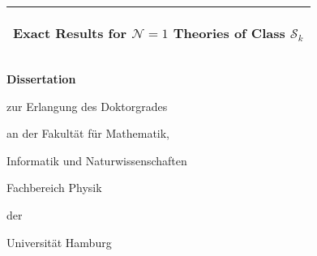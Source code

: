 
\frontmatter

\pagestyle{fancy}
\fancyhf{} %
\renewcommand{\headrulewidth}{0pt} %
\fancyhead[LE,RO]{\thepage} %
\fancyhead[RE]{\MakeTextUppercase{\leftmark}} %
\renewcommand{\chaptermark}[1]{\markboth{#1}{}} %
\setlength{\headheight}{13.6pt}
		
\begin{titlepage}
	\addtolength{\hoffset}{0.5\evensidemargin-0.5\oddsidemargin} %
	\noindent%
	\begin{center}
	\end{center}
	\noindent%
	\begin{tabular}{@{}p{\textwidth}@{}}
		\toprule[2pt]
		\midrule
		\vspace{0.2cm}
		\begin{center}
			\Large{\textbf{\boldmath Exact Results for $\mathcal{N}=1$ Theories of Class $\mathcal{S}_k$}}
		\end{center}
		\vspace{0.2cm}\\
		\midrule
		\toprule[2pt]
	\end{tabular}
	\vspace{1.8 cm}
  {\small
  	\begin{center}
  		{\Large \textbf{Dissertation}}
  		
  		\vspace{1.2cm}
  		\large
  		
  		zur Erlangung des Doktorgrades
  		
  		
  		\vspace{0.2cm}
  		an der Fakult{\"a}t f{\"u}r Mathematik, 

        \vspace{0.2cm}
        Informatik und Naturwissenschaften
  		
  		\vspace{0.2cm}
  		Fachbereich Physik 
  		
  		\vspace{0.2cm}
  		der
  		
  		\vspace{0.2cm}
  		Universit{\"a}t Hamburg
  		

\end{center}}
\end{titlepage}
